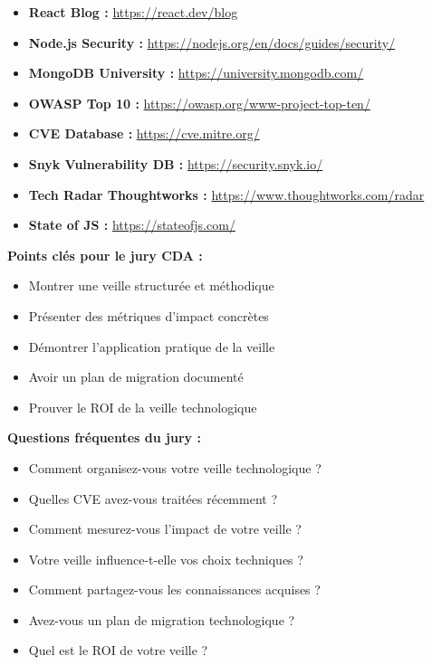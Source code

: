 \begin{itemize}
    \item \textbf{React Blog :} \url{https://react.dev/blog}
    \item \textbf{Node.js Security :} \url{https://nodejs.org/en/docs/guides/security/}
    \item \textbf{MongoDB University :} \url{https://university.mongodb.com/}
    \item \textbf{OWASP Top 10 :} \url{https://owasp.org/www-project-top-ten/}
    \item \textbf{CVE Database :} \url{https://cve.mitre.org/}
    \item \textbf{Snyk Vulnerability DB :} \url{https://security.snyk.io/}
    \item \textbf{Tech Radar Thoughtworks :} \url{https://www.thoughtworks.com/radar}
    \item \textbf{State of JS :} \url{https://stateofjs.com/}
\end{itemize}

\begin{conseil}
\textbf{Points clés pour le jury CDA :}
\begin{itemize}
    \item Montrer une veille structurée et méthodique
    \item Présenter des métriques d'impact concrètes
    \item Démontrer l'application pratique de la veille
    \item Avoir un plan de migration documenté
    \item Prouver le ROI de la veille technologique
\end{itemize}
\end{conseil}

\begin{jury}
\textbf{Questions fréquentes du jury :}
\begin{itemize}
    \item Comment organisez-vous votre veille technologique ?
    \item Quelles CVE avez-vous traitées récemment ?
    \item Comment mesurez-vous l'impact de votre veille ?
    \item Votre veille influence-t-elle vos choix techniques ?
    \item Comment partagez-vous les connaissances acquises ?
    \item Avez-vous un plan de migration technologique ?
    \item Quel est le ROI de votre veille ?
\end{itemize}
\end{jury}